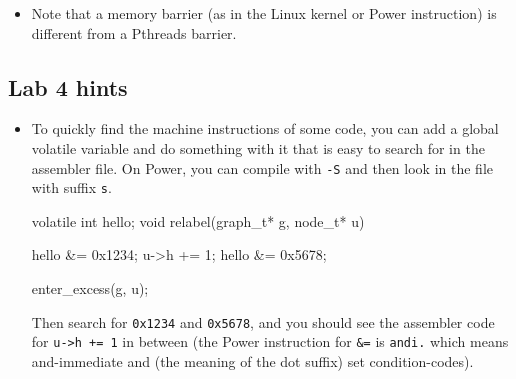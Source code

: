 \documentclass{forsete}
\begin{document}
{\begin{itemize}
\item Note that a memory barrier (as in the Linux kernel or Power instruction) is different from a Pthreads barrier.


\end{itemize}


\subsection*{Lab 4 hints}
\begin{itemize}
\item To quickly find the machine instructions of some code, you can 
add a global volatile variable and do something with it that is easy to search for in
the assembler file.
On Power, you can compile with \verb.-S. and then look in the file with suffix \verb.s.. 
\begin{ccode}
volatile int hello;
void relabel(graph_t* g, node_t* u)
{
	hello &= 0x1234;
        u->h += 1;
	hello &= 0x5678;

        enter_excess(g, u);
}
\end{ccode}
Then search for \verb.0x1234. and \verb.0x5678., and you should see the assembler code for \verb.u->h += 1. in
between (the Power instruction for \verb.&=. is \verb!andi.! which means and-immediate and (the meaning of the dot suffix) set condition-codes).




\end{itemize}

}
\end{document}

